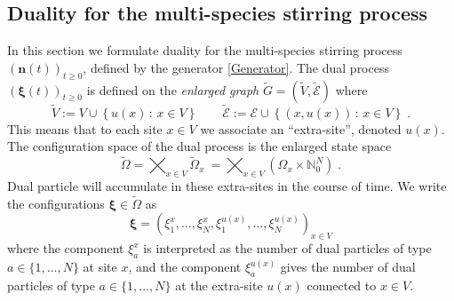 \documentclass[10pt]{article}
\numberwithin{equation}{section}
\numberwithin{equation}{subsection}
\newcommand{\dt}{\;.}
\begin{document}
\subsection{Duality for the multi-species stirring process}\label{statementDualitySubsection}
In this section we formulate duality for the multi-species stirring process $(\bm{n}(t))_{t\geq 0}$, defined by the generator \eqref{Generator}.
The dual  process $(\bm{\xi}(t))_{t\geq 0}$ is defined on the \textit{enlarged graph} $\widetilde{G}=(\widetilde{V},\widetilde{\mathcal{E}})$ where 
\begin{equation}
	\widetilde{V}:=V\cup \left\{u(x)\,:\, x\in V\right\}\qquad \widetilde{\mathcal{E}}:=\mathcal{E}\cup \left\{(x,u(x))\,:\, x\in V\right\}\dt
\end{equation}
This means that to each site $x\in V$ we associate an ``extra-site'', denoted $u(x)$. The configuration space of the dual process is the enlarged state space
\begin{equation}\label{dualStateSpace}
    \widetilde{\Omega}= \bigtimes_{x\in V} \widetilde{\Omega}_{x}\ = \bigtimes_{x\in V} (\Omega_{x}\times \mathbb{N}_{0}^{N})\dt
\end{equation}
Dual particle will accumulate in these extra-sites in the course of time. We write the configurations $\bm{\xi} \in \widetilde\Omega$  as
\begin{equation}
    \bm{\xi}=\left(\xi_{1}^{x},\ldots,\xi_{N}^{x},\xi_{1}^{u(x)},\ldots,\xi_{N}^{u(x)}\right)_{x\in V}
\end{equation}
where the component $\xi_{a}^{x}$ is interpreted as the number of dual particles of type $a\in \{1,\ldots,N\}$ at site $x$, 
and the component $\xi_{a}^{u(x)}$  gives the number of dual particles of type $a\in \{1,\ldots,N\}$ at 
the extra-site $u(x)$ connected to $x\in V$.
\end{document}
